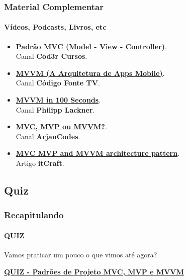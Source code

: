 \documentclass[
	9pt, %
	t, %
]{beamer}
\newcommand{\iconLink}[2]{\href{#1}{\faLink \hspace{0.2em} {#2}}}
\begin{document}
\begin{frame}
	\frametitle{Material Complementar}
	\framesubtitle{Vídeos, Podcasts, Livros, etc}
	
	\begin{itemize}
		\item \iconLink{https://youtu.be/mMDt9g7bMjk}{\textbf{Padrão MVC (Model - View - Controller)}}.\\Canal \textbf{Cod3r Cursos}.\\
		\item \iconLink{https://youtu.be/B2pJWtSyVFA}{\textbf{MVVM (A Arquitetura de Apps Mobile)}}.\\Canal \textbf{Código Fonte TV}.\\
		\item \iconLink{https://www.youtube.com/watch?v=-xTqfilaYow}{\textbf{MVVM in 100 Seconds}}.\\Canal \textbf{Philipp Lackner}.\\
		\item \iconLink{https://www.youtube.com/watch?v=eHhXoCNCI1c}{\textbf{MVC, MVP ou MVVM?}}.\\Canal \textbf{ArjanCodes}.\\
		\item \iconLink{https://itcraftapps.com/blog/mvc-mvp-and-mvvm-architecture-pattern-introduction/}{\textbf{MVC MVP and MVVM architecture pattern}}.\\Artigo \textbf{itCraft}.\\
	\end{itemize}
	
\end{frame}

\subsection{Quiz}

\begin{frame}
	\frametitle{Recapitulando}
	\framesubtitle{QUIZ}

	Vamos praticar um pouco o que vimos até agora?
	\vfill

	\bigskip
	\centering

	\iconLink{https://quizizz.com/admin/quiz/659d7e449a88c830fdf1801c?source=quiz_share}{\textbf{QUIZ - Padrões de Projeto MVC, MVP e MVVM}}
	\vfill
		
\end{frame}

\end{document}
